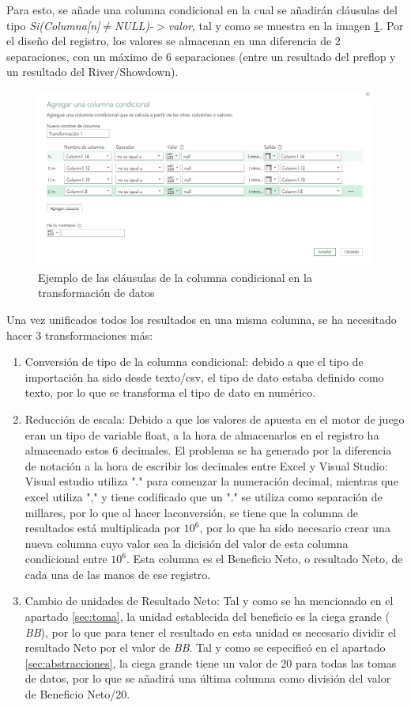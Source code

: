 Para esto, se añade una columna condicional en la cual se añadirán cláusulas del tipo \textit{Si(Columna[n]$\neq$NULL)-$>$valor}, tal y como se muestra en la imagen \ref{fig:tf1}. Por el diseño del registro, los valores se almacenan en una diferencia de 2 separaciones, con un máximo de 6 separaciones (entre un resultado del preflop y un resultado del River/Showdown).
\begin{figure}[h]
\centering
\includegraphics[width=1\textwidth]{figuras/transformacion1.png}   
\caption{Ejemplo de las cláusulas de la columna condicional en la transformación de datos}
\label{fig:tf1}
\end{figure}

Una vez unificados todos los resultados en una misma columna, se ha necesitado hacer 3 transformaciones más:

\begin{enumerate}
\item Conversión de tipo de la columna condicional: debido a que el tipo de importación ha sido desde texto/csv, el tipo de dato estaba definido como texto, por lo que se transforma el tipo de dato en numérico.
\item Reducción de escala: Debido a que los valores de apuesta en el motor de juego eran un tipo de variable float, a la hora de almacenarlos en el registro ha almacenado estos 6 decimales. El problema se ha generado por la diferencia de notación a la hora de escribir los decimales entre Excel y Visual Studio: Visual estudio utiliza "." para comenzar la numeración decimal, mientras que excel utiliza "," y tiene codificado que un "." se utiliza como separación de millares, por lo que al hacer laconversión, se tiene que la columna de resultados está multiplicada por $10^6$, por lo que ha sido necesario crear una nueva columna cuyo valor sea la dicisión del valor de esta columna condicional entre $10^6$. Esta columna es el Beneficio Neto, o resultado Neto, de cada una de las manos de ese registro.
\item Cambio de unidades de Resultado Neto: Tal y como se ha mencionado en el apartado \ref{sec:toma}, la unidad establecida del beneficio es la ciega grande (\textit{ BB}), por lo que para tener el resultado en esta unidad es necesario dividir el resultado Neto por el valor de \textit{BB}. Tal y como se especificó en el apartado \ref{sec:abstracciones}, la ciega grande tiene un valor de 20 para todas las tomas de datos, por lo que se añadirá una última columna como división del valor de Beneficio Neto/20.
\end{enumerate}

